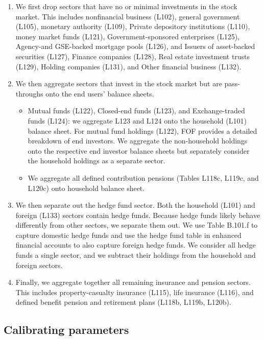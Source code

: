\documentclass[12pt,english]{article}
\begin{document}
\begin{enumerate}
    \item We first drop sectors that have no or minimal investments in the stock market. This includes nonfinancial business (L102), general government (L105), monetary authority (L109), Private depository institutions (L110), money market funds (L121), Government-sponsored enterprises (L125), Agency-and GSE-backed mortgage pools (L126), and Issuers of asset-backed securities (L127), Finance companies (L128), Real estate investment trusts (L129), Holding companies (L131), and Other financial business (L132).

    \item We then aggregate sectors that invest in the stock market but are pass-throughs onto the end users' balance sheets. 
    \begin{itemize}
        \item Mutual funds (L122), Closed-end funds (L123), and Exchange-traded funds (L124): we aggregate L123 and L124 onto the household (L101) balance sheet. For mutual fund holdings (L122), FOF provides a detailed breakdown of end investors. We aggregate the non-household holdings onto the respective end investor balance sheets but separately consider the household holdings as a separate sector. 
        \item We aggregate all defined contribution pensions (Tables L118c, L119c, and  L120c) onto household balance sheet. 
    \end{itemize} 

    \item We then separate out the hedge fund sector. Both the household (L101) and foreign (L133) sectors contain hedge funds. Because hedge funds likely behave differently from other sectors, we separate them out. We use Table B.101.f to capture domestic hedge funds and use the hedge fund table in enhanced financial accounts to also capture foreign hedge funds. We consider all hedge funds a single sector, and we subtract their holdings from the household and foreign sectors. 

    \item Finally, we aggregate together all remaining insurance and pension sectors. This includes property-casualty insurance (L115), life insurance (L116), and defined benefit pension and retirement plans (L118b, L119b, L120b). 
\end{enumerate}

\subsection{Calibrating parameters}
\end{document}
